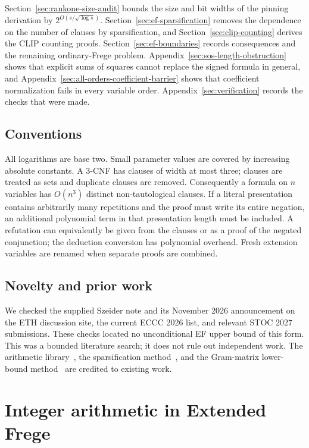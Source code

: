 \documentclass[11pt]{article}
\theoremstyle{definition}
\theoremstyle{remark}
\begin{document}
Section~\ref{sec:rankone-size-audit} bounds the size and bit widths of
the pinning derivation by $2^{O(s/\sqrt{\log s})}$.
Section~\ref{sec:ef-sparsification} removes the dependence on the
number of clauses by sparsification, and
Section~\ref{sec:clip-counting} derives the CLIP counting proofs.
Section~\ref{sec:ef-boundaries} records consequences and the remaining
ordinary-Frege problem. Appendix~\ref{sec:sos-length-obstruction}
shows that explicit sums of squares cannot replace the signed formula
in general, and Appendix~\ref{sec:all-orders-coefficient-barrier}
shows that coefficient normalization fails in every variable order.
Appendix~\ref{sec:verification} records the checks that were made.

\subsection{Conventions}

All logarithms are base two. Small parameter values are covered by
increasing absolute constants. A 3-CNF has clauses of width at most
three; clauses are treated as sets and duplicate clauses are removed.
Consequently a formula on $n$ variables has $O(n^3)$ distinct
non-tautological clauses. If a literal presentation contains
arbitrarily many repetitions and the proof must write its entire
negation, an additional polynomial term in that presentation length
must be included. A refutation can equivalently be given from the
clauses or as a proof of the negated conjunction; the deduction
conversion has polynomial overhead. Fresh extension variables are
renamed when separate proofs are combined.

\subsection{Novelty and prior work}

We checked the supplied Szeider note and its November 2026 announcement
on the ETH discussion site, the current ECCC 2026 list, and relevant
STOC 2027 submissions. These checks located no unconditional EF upper
bound of this form. This was a bounded literature search; it does not
rule out independent work. The arithmetic library~\cite{kls},
the sparsification method~\cite{ipz}, and the Gram-matrix lower-bound
method~\cite{clr} are credited to existing work.

\section{Integer arithmetic in Extended Frege}
\label{sec:integer-ef-interface}
\end{document}
